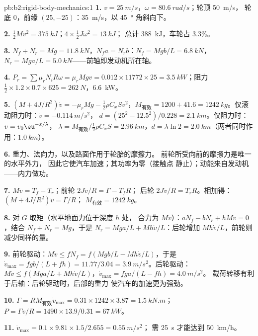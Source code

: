 \begin{solution}{pb:b2:rigid-body-mechanics:1}
\textbf{1.} $v = \qty{25}{m/s}$，$\omega = \qty{80.6}{rad/s}$；轮顶 \qty{50}{m/s}，
轮底 $0$，前缘 $(25, -25)$：\qty{35}{m/s}，以 \qty{45}{\degree} 角斜向下。

\textbf{2.} $\tfrac12Mv^2 = \qty{375}{kJ}$；$4 \times \tfrac12J\omega^2 = \qty{13}{kJ}$；
总计 \qty{388}{kJ}，车轮占 $3.3\%$。

\textbf{3.} $N_f + N_r = Mg = \qty{11.8}{kN}$，$N_fa = N_rb$：$N_f = Mgb/L =
\qty{6.8}{kN}$，$N_r = Mga/L = \qty{5.0}{kN}$——前轴即发动机所在轴。

\textbf{4.} $P_r = \sum\mu_rN_iR\omega = \mu_rMgv = 0.012 \times 11772 \times 25 =
\qty{3.5}{kW}$；阻力 $\tfrac12 \times 1.2 \times 0.7 \times 625 = \qty{262}{N}$，\qty{6.6}{kW}。

\textbf{5.} $(M + 4J/R^2)\dot v = -\mu_rMg - \tfrac12\rho C_xSv^2$，$M_{\text{有效}} =
1200 + 41.6 = \qty{1242}{kg}$。仅滚动阻力时：$\dot v = \qty{-0.114}{m/s^2}$，
$d = (25^2 - 12.5^2)/0.228 = \qty{2.1}{km}$。仅阻力时：$v = v_0\eu^{-x/\lambda}$，
$\lambda = M_{\text{有效}}/\tfrac12\rho C_xS = \qty{2.96}{km}$，$d = \lambda\ln2 =
\qty{2.0}{km}$（两者同时作用：$\qty{1.0}{km}$）。

\textbf{6.} 重力、法向力，以及路面作用于轮胎的摩擦力。
前轮所受向前的摩擦力是唯一的水平外力，
因此它使汽车加速；其功率为零（接触点
静止）；动能来自发动机——内力做功。

\textbf{7.} $M\dot v = T_f - T_r$；前轮 $2J\dot v/R = \Gamma - T_fR$；
后轮 $2J\dot v/R = T_rR$。相加得：$(M + 4J/R^2)\dot v = \Gamma/R$；
$M_{\text{有效}} = \qty{1242}{kg}$。

\textbf{8.} 对 $G$ 取矩（水平地面力位于深度 $h$ 处，
合力为 $M\dot v$）：$aN_f - bN_r + hM\dot v = 0$，结合 $N_f + N_r = Mg$，于是
$N_r = Mga/L + Mh\dot v/L$：后轮增加 $Mh\dot v/L$，前轮则减少同样的量。

\textbf{9.} 前轮驱动：$M\dot v \le fN_f = f(Mgb/L - Mh\dot v/L)$，于是
$\dot v_{\max} = fgb/(L + fh) = 11.77/3.04 = \qty{3.9}{m/s^2}$。后轮驱动：
$M\dot v \le f(Mga/L + Mh\dot v/L)$，$\dot v_{\max} = fga/(L - fh) = \qty{4.0}{m/s^2}$。
载荷转移有利于后轴：后轮驱动时，后部的重力
使汽车的加速更为强劲。

\textbf{10.} $\Gamma = RM_{\text{有效}}\dot v_{\max} = 0.31 \times 1242 \times 3.87 =
\qty{1.5}{kN.m}$；$P = \Gamma v/R = 1490 \times 13.9/0.31 = \qty{67}{kW}$。

\textbf{11.} $\dot v_{\max} = 0.1 \times 9.81 \times 1.5/2.655 = \qty{0.55}{m/s^2}$；
需 \qty{25}{s} 才能达到 \qty{50}{km/h}。


\end{solution}
